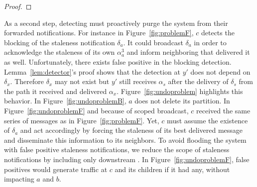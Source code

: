 \begin{proof}
\end{proof}

As a second step, detecting \processes must proactively purge the
system from their forwarded notifications. For instance in
Figure~\ref{fig:problemF}, $c$ detects the blocking of the staleness
notification $\delta_a$. It could broadcast $\delta_a$ in order to
acknowledge the staleness of its own $\alpha_a^3$ and inform
neighboring \processes that delivered it as well. Unfortunately, there
exists false positive in the blocking detection.
Lemma~\ref{lem:detector}'s proof shows that the detection at $y'$ does
not depend on $\delta_x$. Therefore $\delta_x$ may not exist but $y'$
still receives $\alpha_s$ after the delivery of $\delta_s$ from the
path it received and delivered
$\alpha_x$. Figure~\ref{fig:undoproblem} highlights this behavior. In
Figure~\ref{fig:undoproblemB}, $a$ does not delete its partition. In
Figure~\ref{fig:undoproblemF} and because of scoped broadcast, $c$
received the same series of messages as in
Figure~\ref{fig:problemF}. Yet, $c$ must assume the existence of
$\delta_a$ and act accordingly by forcing the staleness of its best
delivered message and disseminate this information to its neighbors.
To avoid flooding the system with false positive staleness
notifications, we reduce the scope of staleness notifications by
including only downstream \processes. In
Figure~\ref{fig:undoproblemF}, false positives would generate traffic
at $c$ and its children if it had any, without impacting $a$ and $b$.

